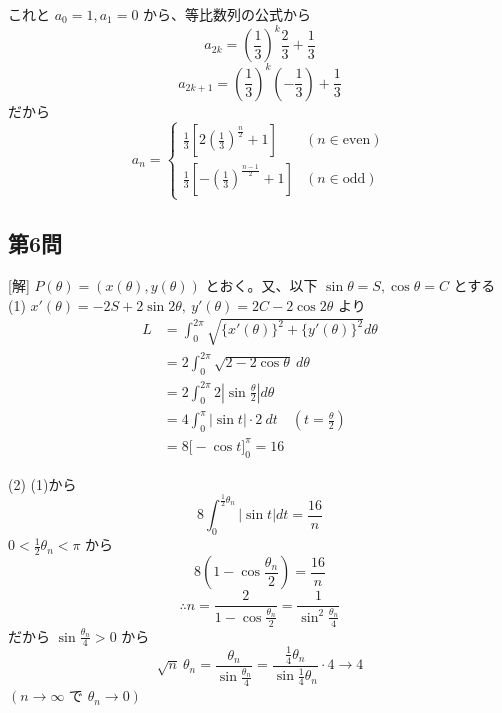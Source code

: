 \documentclass[../main.tex]{subfiles}
\begin{document}
これと $a_0 = 1, a_1 = 0$ から、等比数列の公式から
$$a_{2k} = \left(\frac{1}{3}\right)^k \frac{2}{3} + \frac{1}{3}$$
$$a_{2k+1} = \left(\frac{1}{3}\right)^k \left(-\frac{1}{3}\right) + \frac{1}{3}$$
だから
$$a_n =
\begin{cases} \frac{1}{3}\left[2\left(\frac{1}{3}\right)^{\frac{n}{2}} + 1\right] & (n \in \text{even}) \\ \frac{1}{3}\left[-\left(\frac{1}{3}\right)^{\frac{n-1}{2}} + 1\right] & (n \in \text{odd})
\end{cases}$$

\subsection*{第6問}
[解] $P(\theta) = (x(\theta), y(\theta))$ とおく。又、以下 $\sin\theta = S, \cos\theta = C$ とする
(1) $x'(\theta) = -2S + 2\sin 2\theta, \ y'(\theta) = 2C - 2\cos 2\theta$ より
\begin{align*}
  L &= \int_0^{2\pi} \sqrt{\{x'(\theta)\}^2 + \{y'(\theta)\}^2} d\theta \\
  &= 2 \int_0^{2\pi} \sqrt{2 - 2\cos\theta} \ d\theta \\
  &= 2 \int_0^{2\pi} 2 \left| \sin\frac{\theta}{2} \right| d\theta \\
  &= 4 \int_0^\pi |\sin t| \cdot 2\ dt \quad \left(t = \frac{\theta}{2}\right) \\
  &= 8 \big[ -\cos t \big]_0^\pi = 16
\end{align*}

(2) (1)から
$$8 \int_0^{\frac{1}{2}\theta_n} |\sin t| dt = \frac{16}{n}$$
$0 < \frac{1}{2}\theta_n < \pi$ から
$$8 \left( 1 - \cos\frac{\theta_n}{2} \right) = \frac{16}{n}$$
$$\therefore n = \frac{2}{1 - \cos\frac{\theta_n}{2}} = \frac{1}{\sin^2\frac{\theta_n}{4}}$$
だから $\sin\frac{\theta_n}{4} > 0$ から
$$\sqrt{n}\ \theta_n = \frac{\theta_n}{\sin\frac{\theta_n}{4}} = \frac{\frac{1}{4}\theta_n}{\sin\frac{1}{4}\theta_n} \cdot 4 \to 4$$
$(n \to \infty \text{ で } \theta_n \to 0)$
\end{document}
